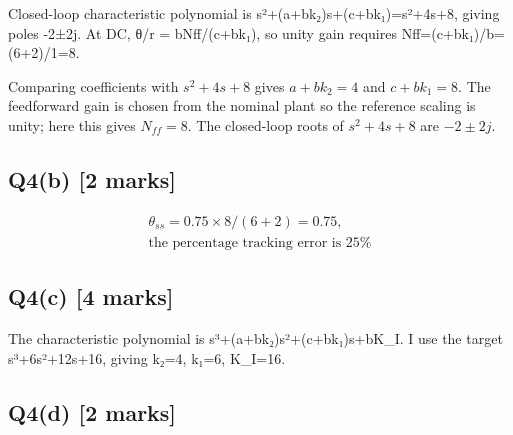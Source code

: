 \documentclass[11pt,a4paper]{article}
\begin{document}
Closed-loop characteristic polynomial is s²+(a+bk₂)s+(c+bk₁)=s²+4s+8, giving poles -2±2j.
At DC, θ/r = bNff/(c+bk₁), so unity gain requires Nff=(c+bk₁)/b=(6+2)/1=8.\par\smallskip Comparing coefficients with $s^2+4s+8$ gives $a+bk_2=4$ and $c+bk_1=8$. The feedforward gain is chosen from the nominal plant so the reference scaling is unity; here this gives $N_{ff}=8$. The closed-loop roots of $s^2+4s+8$ are $-2\pm2j$.

\subsection*{Q4(b) \hfill [2 marks]}

\[\begin{aligned}\theta_{ss} = 0.75\times8/(6+2)=0.75,\\ \text{the percentage tracking error is 25\%}\end{aligned}\]

\subsection*{Q4(c) \hfill [4 marks]}

The characteristic polynomial is s³+(a+bk₂)s²+(c+bk₁)s+bK\_I.
I use the target s³+6s²+12s+16, giving k₂=4, k₁=6, K\_I=16.

\subsection*{Q4(d) \hfill [2 marks]}

\vspace{2mm}
\end{document}

